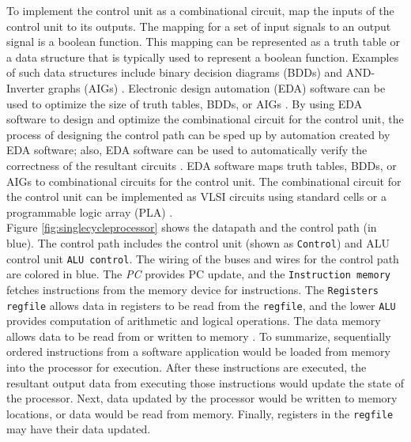 To implement the control unit as a combinational circuit, map the inputs of the control unit to its outputs. The mapping for a set of input signals to an output signal is a boolean function. This mapping can be represented as a truth table \cite{Patterson2005a} or a data structure that is typically used to represent a boolean function. Examples of such data structures include binary decision diagrams (BDDs)\cite{Hachtel1996,Hassoun2002} and AND-Inverter graphs (AIGs) \cite{Wang2009,BLSVG2011}. Electronic design automation (EDA) software can be used to optimize the size of truth tables, BDDs, or AIGs \cite{Wang2009}. By using EDA software to design and optimize the combinational circuit for the control unit, the process of designing the control path can be sped up by automation created by EDA software; also, EDA software can be used to automatically verify the correctness of the resultant circuits \cite{Scheffer2006,Scheffer2006a}. EDA software maps truth tables, BDDs, or AIGs to combinational circuits for the control unit. The combinational circuit for the control unit can be implemented as VLSI circuits using standard cells \cite{Kang2003a,Rabaey2003,Weste2011} or a programmable logic array (PLA) \cite{Patterson2005a}. \\






Figure \ref{fig:singlecycleprocessor} shows the datapath and the control path (in blue). The control path includes the control unit (shown as {\tt Control}) and ALU control unit {\tt ALU control}. The wiring of the buses and wires for the control path are colored in blue. The {\it PC} provides PC update, and the {\tt Instruction memory} fetches instructions from the memory device for instructions. The {\tt Registers regfile} allows data in registers to be read from the {\tt regfile}, and the lower {\tt ALU} provides computation of arithmetic and logical operations. The data memory allows data to be read from or written to memory \cite{Patterson2005,Patterson2009}. To summarize, sequentially ordered instructions from a software application would be loaded from memory into the processor for execution. After these instructions are executed, the resultant output data from executing those instructions would update the state of the processor. Next, data updated by the processor would be written to memory locations, or data would be read from memory. Finally, registers in the {\tt regfile} may have their data updated.



